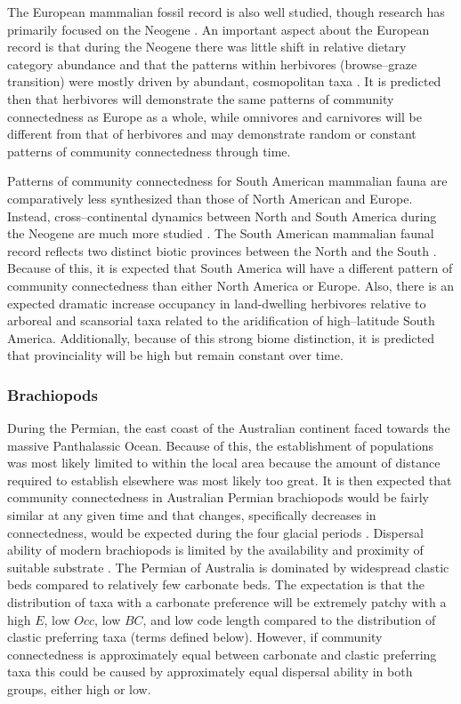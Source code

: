 \documentclass[12pt,letterpaper]{article}
\begin{document}
The European mammalian fossil record is also well studied, though research has primarily focused on the Neogene \citep{Jernvall2002,Jernvall2004,Liow2008,Raia2006,Raia2005,Raia2011c}. An important aspect about the European record is that during the Neogene there was little shift in relative dietary category abundance \citep{Jernvall2004} and that the patterns within herbivores (browse--graze transition) were mostly driven by abundant, cosmopolitan taxa \citep{Jernvall2002}. It is predicted then that herbivores will demonstrate the same patterns of community connectedness as Europe as a whole, while omnivores and carnivores will be different from that of herbivores and may demonstrate random or constant patterns of community connectedness through time. 

Patterns of community connectedness for South American mammalian fauna are comparatively less synthesized than those of North American and Europe. Instead, cross--continental dynamics between North and South America during the Neogene are much more studied \citep{Marshall1982}. The South American mammalian faunal record reflects two distinct biotic provinces between the North and the South \citep{Macfadden1997,Macfadden2006,Flynn1998a,Patterson1968}. Because of this, it is expected that South America will have a different pattern of community connectedness than either North America or Europe. Also, there is an expected dramatic increase occupancy in land-dwelling herbivores relative to arboreal and scansorial taxa related to the aridification of high--latitude South America. Additionally, because of this strong biome distinction, it is predicted that provinciality will be high but remain constant over time. %

\subsubsection{Brachiopods}
During the Permian, the east coast of the Australian continent faced towards the massive Panthalassic Ocean. Because of this, the establishment of populations was most likely limited to within the local area because the amount of distance required to establish elsewhere was most likely too great. It is then expected that community connectedness in Australian Permian brachiopods would be fairly similar at any given time and that changes, specifically decreases in connectedness, would be expected during the four glacial periods \citep{Fielding2008a,Fielding2008}. Dispersal ability of modern brachiopods is limited by the availability and proximity of suitable substrate \citep{Richardson1997,Richardson1997a}. The Permian of Australia is dominated by widespread clastic beds compared to relatively few carbonate beds. The expectation is that the distribution of taxa with a carbonate preference will be extremely patchy with a high \(E\), low \(Occ\), low \(BC\), and low code length compared to the distribution of clastic preferring taxa (terms defined below). However, if community connectedness is approximately equal between carbonate and clastic preferring taxa this could be caused by approximately equal dispersal ability in both groups, either high or low.
\end{document}
